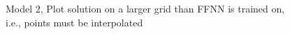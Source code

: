 \begin{figure}[H]
\centering
{}
\qquad
{}
\qquad
{}
\caption{Model 2, Plot solution on a larger grid than FFNN is trained on, i.e., points must be interpolated}
\label{fig:heat_nn2}
\end{figure}


